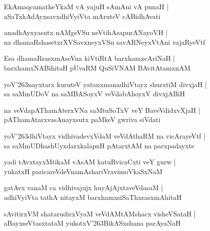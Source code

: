 \documentclass[twoside,12pt,openright]{book}
\def\S{\char'263}
\newcounter{shloka}[chapter]
\begin{document}
\begin{shloka}
EkAmaqcamatheYkaM vA yajuH sAmAni vA punaH |\\
aSaTxkAdAyxsavxdhiVyiVta mAruteV cABidhAvati 
\end{shloka}

\begin{shloka}
anadhAyxyasutx nAMgeVSu  neVtihAsapurANayoVH |\\
na dhamaRshasetxrXVSavxneyxVSu savARNeyxVtAni vajaRyeVtf 
\end{shloka}

\begin{shloka}
Esa dhamaRsasxmAseVna kiVtiRtA barxhamxcAriNaH |\\
barxhamxNABihitaH pUvaRM QuSiVNAM BAvitAtamxnAM 
\end{shloka}

\begin{shloka}
yoV\S nayxtarx kuruteV yatanxmanadhiVtayx shurxtiM divxjaH |\\
sa saMmUDoV na saMBASoyxV veVdabAhoyxV divxjABiH  
\end{shloka}

\begin{shloka}
na veVdapAThamAterxVNa saMtuSoTxV veY BaveVdidxvXjaH |\\
pAThamAtarxvasAnayxsutx paMkeV gwriva siVdati 
\end{shloka}

\begin{shloka}
yoV\S dhiVtayx vidhivadevxVdaM veVdAthaRM na vicArayeVtf |\\
sa saMmUDhashUyxdarxkalapxH pAtarxtAM na parxpadayxte
\end{shloka}

\begin{shloka}
yadi tAvxtayxMtikaM vAsAM katuRvicaCxti veY gurw |\\
yukatxH paricareVdeVnamAshariVravimoVkaSxNaM 
\end{shloka}

\begin{shloka}
gatAvx vanaM ca vidhivajujx huyAjAjxtaveVdasaM |\\
adhiVyiVta tathA nitayxM barxhamxsiSaThxsasxmAhitaH 
\end{shloka}

\begin{shloka}
sAvitirxVM shatarudirxVyaM veVdAMtAMshacx visheVSataH |\\
aBayxseVtasxtataM yukotxV\S BikASxshana parAyaNaH 
\end{shloka}
\end{document}
